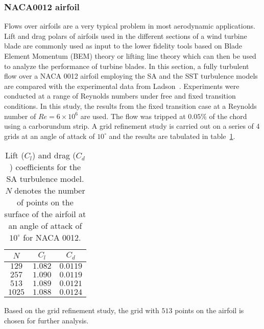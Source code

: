 \subsubsection{NACA0012 airfoil}\label{ssec:NACA0012ss}
Flows over airfoils are a very typical problem in most aerodynamic applications. Lift and drag polars of airfoils used in the different sections of a wind turbine blade are commonly used as input to the lower fidelity tools based on Blade Element Momentum (BEM) theory or lifting line theory which can then be used to analyze the performance of turbine blades. In this section, a fully turbulent flow over a NACA 0012 airfoil employing the SA and the SST turbulence models are compared with the experimental data from Ladson~\cite{ladson1988effects}. Experiments were conducted at a range of Reynolds numbers under free and fixed transition conditions. In this study, the results from the fixed transition case at a Reynolds number of $Re =6\times10^6$ are used. The flow was tripped at $0.05\%$ of the chord using a carborundum strip. A grid refinement study is carried out on a series of 4 grids at an angle of attack of $10^{\circ}$ and the results are tabulated in table~\ref{tab:san12gridref}.
\begin{table}[h!]
\centering
\captionsetup{justification=centering}
\begin{tabular}{ |c|c|c| } 
\hline
 $N$ & $C_l$ & $C_d$ \\
\hline
$129$& $1.082$& $0.0119$\\
\hline
$257$& $1.090$& $0.0119$\\
\hline
$513$& $1.089$& $0.0121$\\
\hline
$1025$& $1.088$& $0.0124$\\
\hline
\end{tabular}
\caption{Lift ($C_l$) and drag ($C_d$) coefficients for the SA turbulence model. $N$ denotes the number of points on the surface of the airfoil at an angle of attack of $10^{\circ}$ for NACA 0012.}
\label{tab:san12gridref}
\end{table}
Based on the grid refinement study, the grid with $513$ points on the airfoil is chosen for further analysis.
